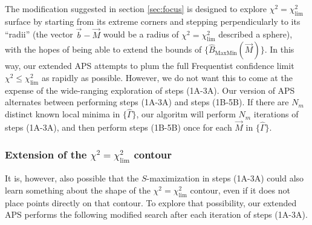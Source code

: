 \documentclass[useAMS,usenatbib]{aastex}
\begin{document}
The modification suggested in section \ref{sec:focus} is designed to explore 
$\chi^2=\chi^2_\text{lim}$ surface by starting from its extreme corners and stepping
perpendicularly to its ``radii'' (the vector $\vec{b}-\vec{M}$ would be a radius of
$\chi^2=\chi^2_\text{lim}$ described a sphere), with the hopes of being able
to extend the bounds of $\{\hat{B}_\text{MaxMin}(\vec{M})\}$.  In this way,
our extended APS attempts to plum the full Frequentist confidence limit $\chi^2\le\chi^2_\text{lim}$
as rapidly as possible.  However, we do not want this to come at the expense of the wide-ranging
exploration of steps (1A-3A).  Our version of APS alternates between performing steps (1A-3A) and steps
(1B-5B).  If there are $N_m$ distinct known local minima in $\{\hat{\Gamma}\}$, 
our algoritm will perform
$N_m$ iterations of steps (1A-3A), and then perform steps (1B-5B) once for each
$\vec{M}$ in $\{\hat{\Gamma}\}$.

\subsubsection{Extension of the $\chi^2=\chi^2_\text{lim}$ contour}
\label{sec:unitSphere}

It is, however, also possible
that the $S$-maximization in steps (1A-3A) could also learn something about the
shape of the $\chi^2=\chi^2_\text{lim}$ contour, even if it does not place
points directly on that contour.  To explore that possibility, our
extended APS performs the
following modified search after each iteration of steps (1A-3A).
\end{document}
